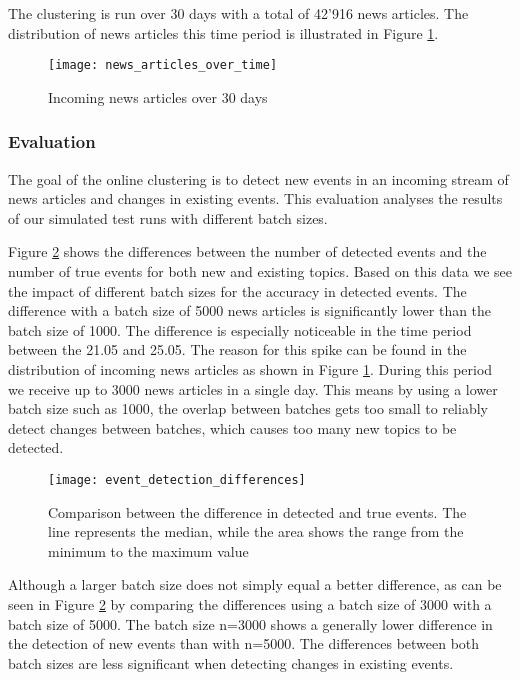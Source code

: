 The clustering is run over 30 days with a total of 42'916 news articles. The distribution of news articles this time period is illustrated in Figure \ref{fig:news_articles_over_time}.

\begin{figure}[h]
    \centering
    \texttt{[image: news\_articles\_over\_time]}
    \caption{Incoming news articles over 30 days}
    \label{fig:news_articles_over_time}
\end{figure}

\subsubsection{Evaluation}

The goal of the online clustering is to detect new events in an incoming stream of news articles and changes in existing events. This evaluation analyses the results of our simulated test runs with different batch sizes.

Figure \ref{fig:event_detection_differences} shows the differences between the number of detected events and the number of true events for both new and existing topics. Based on this data we see the impact of different batch sizes for the accuracy in detected events. The difference with a batch size of 5000 news articles is significantly lower than the batch size of 1000. The difference is especially noticeable in the time period between the 21.05 and 25.05. The reason for this spike can be found in the distribution of incoming news articles as shown in Figure \ref{fig:news_articles_over_time}. During this period we receive up to 3000 news articles in a single day. This means by using a lower batch size such as 1000, the overlap between batches gets too small to reliably detect changes between batches, which causes too many new topics to be detected. 

\begin{figure}[h]
    \centering
    \texttt{[image: event\_detection\_differences]}
    \caption{Comparison between the difference in detected and true events. The line represents the median, while the area shows the range from the minimum to the maximum value}
    \label{fig:event_detection_differences}
\end{figure}

Although a larger batch size does not simply equal a better difference, as can be seen in Figure \ref{fig:event_detection_differences} by comparing the differences using a batch size of 3000 with a batch size of 5000. The batch size n=3000 shows a generally lower difference in the detection of new events than with n=5000. The differences between both batch sizes are less significant when detecting changes in existing events.

